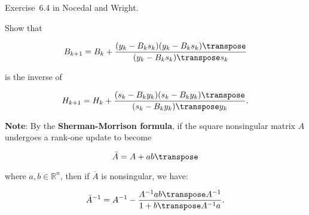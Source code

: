 \begin{problem}\label{prob:02}%
  Exercise~6.4 in Nocedal and Wright.
  
  Show that
  
  \[ B_{k+1} = B_{k} + \frac{(y_k-B_{k}s_{k})(y_k-B_{k}s_{k})\transpose}{(y_k-B_{k}s_{k})\transpose s_k} \]
  
  is the inverse of 
   
  \[ H_{k+1} = H_k + \frac{(s_k-B_{k}y_{k})(s_k-B_{k}y_{k})\transpose}{(s_k-B_{k}y_{k})\transpose y_k} \text{.}\]
  
  \textbf{Note}: \textnormal{By the \textbf{Sherman-Morrison formula}, if the square nonsingular matrix $A$ undergoes a rank-one update to become}
  
  \[\bar{A} = A + ab\transpose\]
  
  where $a,b\in \mathbb{R}^n$, then if $\overline{A}$ is nonsingular, we have:
  
  \[\bar{A}^{-1} = A^{-1} - \frac{A^{-1}ab\transpose A^{-1}}{1+b\transpose A^{-1}a} \text{.} \]
\end{problem}


